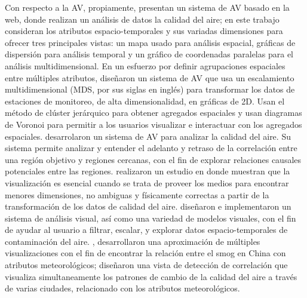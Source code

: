 Con respecto a la AV, propiamente, \citet{Liao2014} presentan un sistema de AV basado en la web, donde realizan un análisis de datos la calidad del aire; en este trabajo consideran los atributos espacio-temporales y sus variadas dimensiones para ofrecer tres principales vistas: un mapa usado para análisis espacial, gráficas de dispersión para análisis temporal y un gráfico de coordenadas paralelas para el análisis multidimensional. En un esfuerzo por definir agrupaciones espaciales entre múltiples atributos, \citet{Zhou2017} diseñaron un sistema de AV que usa un escalamiento multidimensional (MDS, por sus siglas en inglés) para transformar los datos de estaciones de monitoreo, de alta dimensionalidad, en gráficas de 2D. Usan el método de clúster jerárquico para obtener agregados espaciales y usan diagramas de Voronoi para permitir a los usuarios visualizar e interactuar con los agregados espaciales. \citet{Du2018} desarrolaron un sistema de AV para analizar la calidad del aire. Su sistema permite analizar y entender el adelanto y retraso de la correlación entre una región objetivo y regiones cercanas, con el fin de explorar relaciones causales potenciales entre las regiones. \citet{Engel2012} realizaron un estudio en donde muestran que la visualización es esencial cuando se trata de proveer los medios para encontrar menores dimensiones, no ambiguas y físicamente correctas a partir de la transformación de los datos de calidad del aire. \citet{Yang2021} diseñaron e implementaron un sistema de análisis visual, así como una variedad de modelos visuales, con el fin de ayudar al usuario a filtrar, escalar, y explorar datos espacio-temporales de contaminación del aire. \citet{Li2016}, desarrollaron una aproximación de múltiples visualizaciones con el fin de encontrar la relación entre el smog en China con atributos meteorológicos; diseñaron una vista de detección de correlación que visualiza simultaneamente los patrones de cambio de la calidad del aire a través de varias ciudades, relacionado con los atributos meteorológicos.
